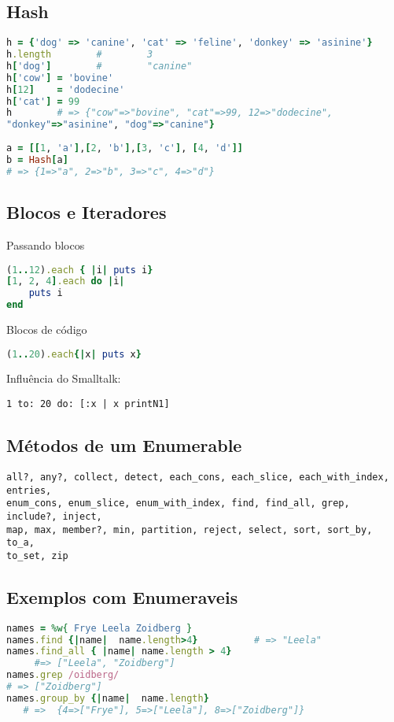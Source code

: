 \documentclass[serif,mathserif]{article}
\begin{document}
\subsection{Hash}
\begin{lstlisting}[language=ruby]
h = {'dog' => 'canine', 'cat' => 'feline', 'donkey' => 'asinine'}
h.length        #        3
h['dog']        #        "canine"
h['cow'] = 'bovine'
h[12]    = 'dodecine'
h['cat'] = 99
h        # => {"cow"=>"bovine", "cat"=>99, 12=>"dodecine",
"donkey"=>"asinine", "dog"=>"canine"}
  
a = [[1, 'a'],[2, 'b'],[3, 'c'], [4, 'd']]
b = Hash[a]
# => {1=>"a", 2=>"b", 3=>"c", 4=>"d"}
\end{lstlisting}


\subsection{Blocos e Iteradores}

Passando blocos
\begin{lstlisting}[language=ruby]
(1..12).each { |i| puts i}
[1, 2, 4].each do |i|
    puts i
end
\end{lstlisting}

Blocos de código
\begin{lstlisting}[language=ruby]
(1..20).each{|x| puts x}
\end{lstlisting}

Influência do Smalltalk:
\begin{lstlisting}[language=smalltalk]
   1 to: 20 do: [:x | x printN1]
\end{lstlisting}

\subsection{ Métodos de um Enumerable}
\begin{lstlisting}  
all?, any?, collect, detect, each_cons, each_slice, each_with_index, entries,
enum_cons, enum_slice, enum_with_index, find, find_all, grep, include?, inject,
map, max, member?, min, partition, reject, select, sort, sort_by, to_a,
to_set, zip
\end{lstlisting}
 
\subsection{Exemplos com Enumeraveis}
\begin{lstlisting}[language=ruby]
names = %w{ Frye Leela Zoidberg }
names.find {|name|  name.length>4}          # => "Leela"
names.find_all { |name| name.length > 4}
     #=> ["Leela", "Zoidberg"]
names.grep /oidberg/
# => ["Zoidberg"]
names.group_by {|name|  name.length}
   # =>  {4=>["Frye"], 5=>["Leela"], 8=>["Zoidberg"]}
\end{lstlisting}
\end{document}
